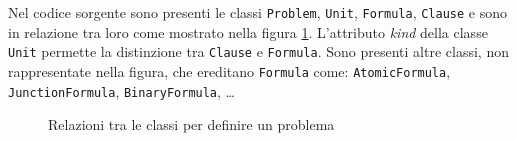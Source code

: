 Nel codice sorgente sono presenti le classi \verb|Problem|, \verb|Unit|, \verb|Formula|, \verb|Clause| e sono in relazione tra loro come mostrato nella figura \ref{fig:relazioni-classi}.
L'attributo \emph{kind} della classe \verb|Unit| permette la distinzione tra \verb|Clause| e \verb|Formula|.
Sono presenti altre classi, non rappresentate nella figura, che ereditano \verb|Formula| come:
\verb|AtomicFormula|, \verb|JunctionFormula|, \verb|BinaryFormula|, \dots 
\vspace{.3cm}
\begin{figure}[H]
    \caption{Relazioni tra le classi per definire un problema}
    \label{fig:relazioni-classi}
\end{figure}
